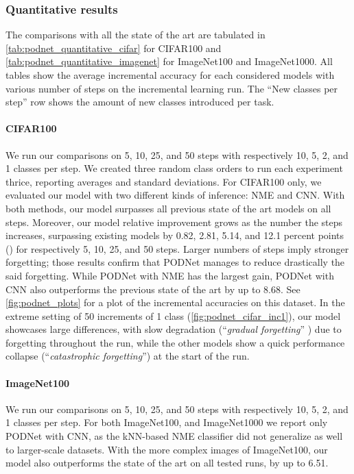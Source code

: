




\subsubsection{Quantitative results}
\label{sec:podnet_quantitative_results}

The comparisons with all the state of the art are tabulated in
\autoref{tab:podnet_quantitative_cifar} for CIFAR100 and \autoref{tab:podnet_quantitative_imagenet}
for ImageNet100 and ImageNet1000. All tables show the average incremental accuracy for each
considered models with various number of steps on the incremental learning run. The ``New classes
per step'' row shows the amount of new classes introduced per task.

\paragraph{CIFAR100} We run our comparisons on 5, 10, 25, and 50 steps with respectively 10, 5, 2,
and 1 classes per step. We created three random class orders to run each experiment thrice,
reporting averages and standard deviations. For CIFAR100 only, we evaluated our model with two
different kinds of inference: \ac{NME} and CNN. With both methods, our model surpasses all previous
state of the art models on all steps. Moreover, our model relative improvement grows as the number
the steps increases, surpassing existing models by 0.82, 2.81, 5.14, and 12.1 percent points (\pp)
for respectively 5, 10, 25, and 50 steps. Larger numbers of steps imply  stronger forgetting; those
results confirm that \ac{PODNet} manages to reduce drastically the said forgetting. While
\ac{PODNet} with \ac{NME} has the largest gain, \ac{PODNet} with CNN also outperforms the previous
state of the art by up to 8.68\pp. See \autoref{fig:podnet_plots} for a plot of the incremental
accuracies on this dataset. In the extreme setting of 50 increments of 1 class
(\autoref{fig:podnet_cifar_inc1}), our model showcases large differences, with slow degradation
(``\textit{gradual forgetting}'' \citep{french1999catastrophicforgetting}) due to forgetting
throughout the run, while the other models show a quick performance collapse (``\textit{catastrophic
    forgetting}'') at the start of the run.

\paragraph{ImageNet100} We run our comparisons on 5, 10, 25, and 50 steps with respectively 10, 5,
2, and 1 classes per step. For both ImageNet100, and ImageNet1000 we report only \ac{PODNet} with
CNN, as the kNN-based \ac{NME} classifier did not generalize as well to larger-scale datasets. With
the more complex images of ImageNet100, our model also outperforms the state of the art on all
tested runs, by up to 6.51\pp.

